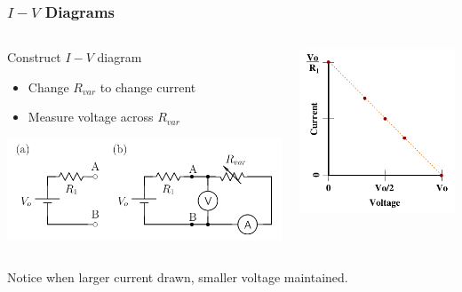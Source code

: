 \documentclass[beamer]{standalone}
\begin{document}
\begin{frame}
 \frametitle{$I-V$ Diagrams}
 \begin{columns}[T]
  \begin{column}{0.6\textwidth}
   \begin{block}{Construct $I-V$ diagram}
    \begin{itemize}
     \item Change $R_{var}$ to change current
     \item Measure voltage across $R_{var}$
    \end{itemize}
   \end{block}
   \includegraphics[width=\textwidth]{./pics/IV_circuit}
  \end{column}
  \begin{column}{0.4\textwidth}
   \includegraphics[width=\textwidth]{./pics/IV_Thevenin}
  \end{column}
 \end{columns}
 Notice when larger current drawn, smaller voltage maintained.
\end{frame}
\end{document}
